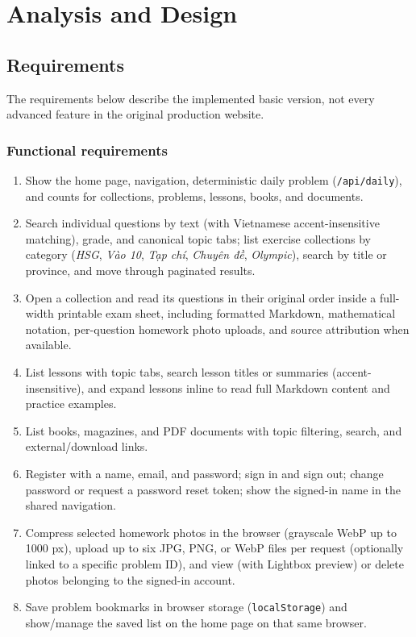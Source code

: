 \section{Analysis and Design}
\subsection{Requirements}
The requirements below describe the implemented basic version, not every advanced feature in the original production website.

\subsubsection{Functional requirements}
\begin{enumerate}[label=FR\arabic*.]
  \item Show the home page, navigation, deterministic daily problem (\texttt{/api/daily}), and counts for collections, problems, lessons, books, and documents.
  \item Search individual questions by text (with Vietnamese accent-insensitive matching), grade, and canonical topic tabs; list exercise collections by category (\textit{HSG}, \textit{Vào 10}, \textit{Tạp chí}, \textit{Chuyên đề}, \textit{Olympic}), search by title or province, and move through paginated results.
  \item Open a collection and read its questions in their original order inside a full-width printable exam sheet, including formatted Markdown, mathematical notation, per-question homework photo uploads, and source attribution when available.
  \item List lessons with topic tabs, search lesson titles or summaries (accent-insensitive), and expand lessons inline to read full Markdown content and practice examples.
  \item List books, magazines, and PDF documents with topic filtering, search, and external/download links.
  \item Register with a name, email, and password; sign in and sign out; change password or request a password reset token; show the signed-in name in the shared navigation.
  \item Compress selected homework photos in the browser (grayscale WebP up to 1000 px), upload up to six JPG, PNG, or WebP files per request (optionally linked to a specific problem ID), and view (with Lightbox preview) or delete photos belonging to the signed-in account.
  \item Save problem bookmarks in browser storage (\texttt{localStorage}) and show/manage the saved list on the home page on that same browser.
\end{enumerate}


